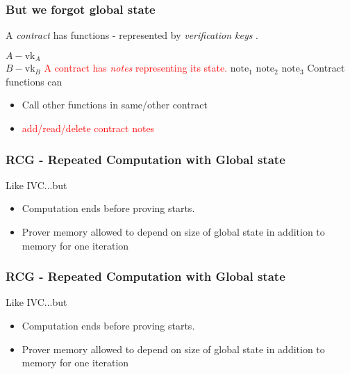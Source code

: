 \documentclass[shadesubsections,compress,14pt,mathserif]{beamer}
\newcommand{\set}[1]{\ensuremath{\left\{#1\right\}}}
\newcommand{\acc}{{\mathbf{acc}}}
\newcommand{\nl}{\\ \pause \vspace{0.2in}}
\newcommand{\rel}{\ensuremath{\mathcal{R}}}
\newcommand{\vk}{\ensuremath{\mathrm{vk} }}
\newcommand{\add}{\ensuremath{\mathrm{add} }}
\renewcommand{\read}{\ensuremath{\mathrm{read} }}
\renewcommand{\note}{\ensuremath{\mathrm{note} }}
\newcommand{\args}{\ensuremath{\mathrm{args} }}
\begin{document}
\begin{frame}
 \frametitle{ But we forgot global state }
A \emph{contract} has functions - represented by \emph{verification keys} .

$A - \vk_A$\nl
$B - \vk_B$
{\textcolor{red}{A contract has \emph{notes} representing its state.}}
$\note_1$
$\note_2$
$\note_3$
 Contract functions can 
 \begin{itemize}
  \item Call other functions in same/other contract
 \item \textcolor{red}{add/read/delete contract notes}
 \end{itemize}
 \end{frame}
%  
%  
%  
%  
\begin{frame}
 \frametitle{RCG - Repeated Computation with Global state}
 Like IVC...but
 \begin{itemize}
  \item Computation ends before proving starts.
  \item Prover memory allowed to depend on size of global state in addition to memory for one iteration
 \end{itemize}

\end{frame}
\begin{frame}
 \frametitle{RCG - Repeated Computation with Global state}
 Like IVC...but
 \begin{itemize}
  \item Computation ends before proving starts.
  \item Prover memory allowed to depend on size of global state in addition to memory for one iteration
 \end{itemize}
\end{frame}
% 
\end{document}
